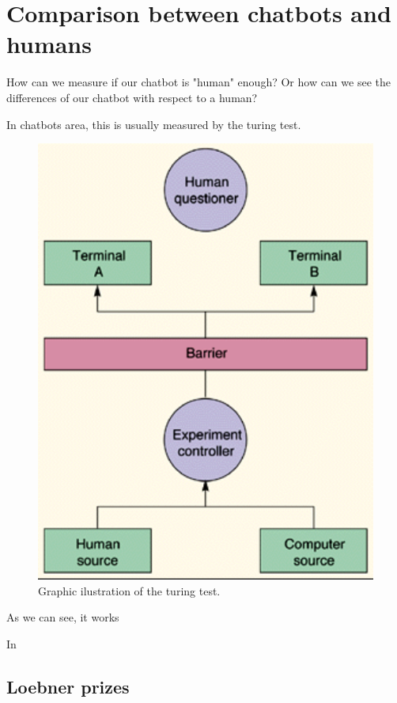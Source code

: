 \documentclass[12pt,twoside]{article}
\theoremstyle{plain}
\theoremstyle{definition}
\theoremstyle{remark}
\begin{document}
\section{Comparison between chatbots and humans}
\label{sec:comparison}

How can we measure if our chatbot is "human" enough? Or how can we see the differences of our chatbot with respect to a human?

In chatbots area, this is usually measured by the turing test.

\begin{figure}[H]
	\centering
	\includegraphics[scale=0.8]{./Pictures/turing_test.png}
	\caption{Graphic ilustration of the turing test.}
	\label{fig::turing_test} 
\end{figure}

As we can see, it works

In \cite{HILL2015245}

\subsection{Loebner prizes}
	\label{sec:loebner}
	
\end{document}
